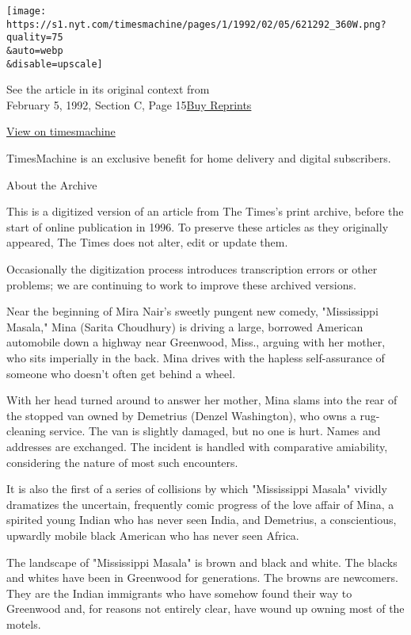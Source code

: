 \texttt{[image: https://s1.nyt.com/timesmachine/pages/1/1992/02/05/621292\_360W.png?quality=75\\\&auto=webp\\\&disable=upscale]}

See the article in its original context from\\
February 5, 1992, Section C, Page
15\href{https://store.nytimes.com/collections/new-york-times-page-reprints?utm_source=nytimes\&utm_medium=article-page\&utm_campaign=reprints}{Buy
Reprints}

\href{http://timesmachine.nytimes.com/timesmachine/1992/02/05/621292.html}{View
on timesmachine}

TimesMachine is an exclusive benefit for home delivery and digital
subscribers.

About the Archive

This is a digitized version of an article from The Times's print
archive, before the start of online publication in 1996. To preserve
these articles as they originally appeared, The Times does not alter,
edit or update them.

Occasionally the digitization process introduces transcription errors or
other problems; we are continuing to work to improve these archived
versions.

Near the beginning of Mira Nair's sweetly pungent new comedy,
"Mississippi Masala," Mina (Sarita Choudhury) is driving a large,
borrowed American automobile down a highway near Greenwood, Miss.,
arguing with her mother, who sits imperially in the back. Mina drives
with the hapless self-assurance of someone who doesn't often get behind
a wheel.

With her head turned around to answer her mother, Mina slams into the
rear of the stopped van owned by Demetrius (Denzel Washington), who owns
a rug-cleaning service. The van is slightly damaged, but no one is hurt.
Names and addresses are exchanged. The incident is handled with
comparative amiability, considering the nature of most such encounters.

It is also the first of a series of collisions by which "Mississippi
Masala" vividly dramatizes the uncertain, frequently comic progress of
the love affair of Mina, a spirited young Indian who has never seen
India, and Demetrius, a conscientious, upwardly mobile black American
who has never seen Africa.

The landscape of "Mississippi Masala" is brown and black and white. The
blacks and whites have been in Greenwood for generations. The browns are
newcomers. They are the Indian immigrants who have somehow found their
way to Greenwood and, for reasons not entirely clear, have wound up
owning most of the motels.

